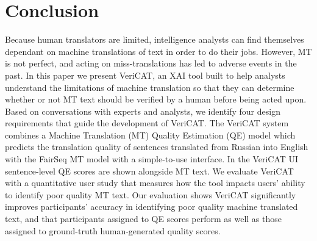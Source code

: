 \section{Conclusion}

Because human translators are limited, intelligence analysts can find themselves dependant on machine translations of text in order to do their jobs. However, MT is not perfect, and acting on miss-translations has led to adverse events in the past. In this paper we present VeriCAT, an XAI tool built to help analysts understand the limitations of machine translation so that they can determine whether or not MT text should be verified by a human before being acted upon. Based on conversations with experts and analysts, we identify four design requirements that guide the development of VeriCAT. The VeriCAT system combines a Machine Translation (MT) Quality Estimation (QE) model which predicts the translation quality of sentences translated from Russian into English with the FairSeq MT model with a simple-to-use interface. In the VeriCAT UI sentence-level QE scores are shown alongside MT text. We evaluate VeriCAT with a quantitative user study that measures how the tool impacts users’ ability to identify poor quality MT text. Our evaluation shows VeriCAT significantly improves participants' accuracy in identifying poor quality machine translated text, and that participants assigned to QE scores perform as well as those assigned to ground-truth human-generated quality scores. 

